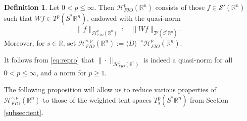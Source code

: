 \documentclass{amsart}
\newcommand {\ud}{\mathrm{d}}
\newcommand {\HT}{\mathcal{H}}
\newcommand {\Hp}{\mathcal{H}^{p}_{FIO}(\Rn)}
\newcommand {\Hps}{\mathcal{H}^{s,p}_{FIO}(\Rn)}
\newcommand {\rb}{\rangle}
\newcommand {\lb}{\langle}
\newcommand {\R}{\mathbb R}
\newcommand {\Rn}{\mathbb{R}^{n}}
\newcommand {\Sp}{S^{*}\Rn}
\newcommand {\Sw}{\mathcal{S}}
\newcommand {\w}{\omega}
\DeclareMathOperator*{\esssup}{ess\,sup}
\theoremstyle{definition}
\newtheorem{definition}[theorem]{Definition}
\newtheorem{remark}[theorem]{Remark}
\numberwithin{equation}{section}
\begin{document}
\begin{definition}\label{def:HpFIO}
Let $0<p\leq\infty$. Then $\Hp$ consists of those $f\in\Sw'(\Rn)$ such that $Wf\in T^{p}(\Sp)$, endowed with the quasi-norm
\[
\|f\|_{\Hp}:=\|Wf\|_{T^{p}(\Sp)}.
\]
Moreover, for $s\in\R$, set $\Hps:=\lb D\rb^{-s}\Hp$. 
\end{definition}

It follows from \eqref{eq:repro} that $\|\cdot\|_{\Hp}$ is indeed a quasi-norm for all $0<p\leq\infty$, and a norm for $p\geq1$. 




The following proposition will allow us to reduce various properties of $\Hps$ to those of the weighted tent spaces $T^{p}_{s}(\Sp)$ from Section \ref{subsec:tent}.
\end{document}
